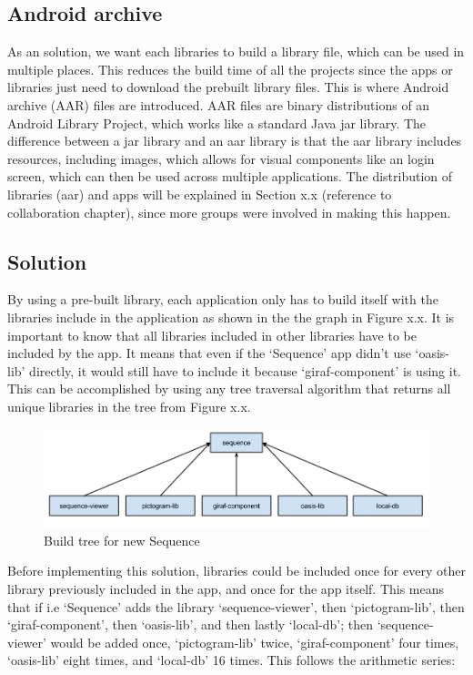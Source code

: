 \subsection{Android archive}
As an solution, we want each libraries to build a library file, which can be used in multiple places. This reduces the build time of all the projects since the apps or libraries just need to download the prebuilt library files.
This is where Android archive (AAR) files are introduced. AAR files are binary distributions of an Android Library Project, which works like a standard Java jar library. The difference between a jar library and an aar library is that the aar library includes resources, including images, which allows for visual components like an login screen, which can then be used across multiple applications. 
The distribution of libraries (aar) and apps will be explained in Section x.x (reference to collaboration chapter), since more groups were involved in making this happen.

\subsection{Solution}
By using a pre-built library, each application only has to build itself with the libraries include in the application as shown in the the graph in Figure x.x. It is important to know that all libraries included in other libraries have to be included by the app. It means that even if the ‘Sequence’ app didn't use ‘oasis-lib’ directly, it would still have to include it because ‘giraf-component’ is using it. This can be accomplished by using any tree traversal algorithm that returns all unique libraries in the tree from Figure x.x.

\begin{figure}[H]
	\centering
	\includegraphics[width=0.8 \textwidth]{pictures/newbuild.png}
	\caption{Build tree for new Sequence}
	\label{newbuild}
\end{figure}

Before implementing this solution, libraries could be included once for every other library previously included in the app, and once for the app itself. This means that if i.e ‘Sequence’ adds the library ‘sequence-viewer’, then ‘pictogram-lib’, then ‘giraf-component’, then ‘oasis-lib’, and then lastly ‘local-db’; then ‘sequence-viewer’ would be added once, ‘pictogram-lib’ twice, ‘giraf-component’ four times, ‘oasis-lib’ eight times, and ‘local-db’ 16 times. This follows the arithmetic series:


